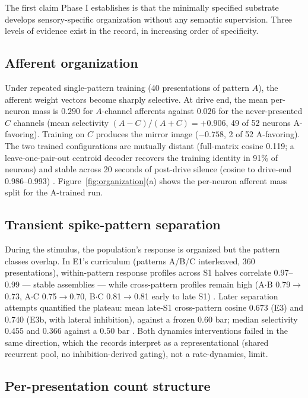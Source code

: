 The first claim Phase I establishes is that the minimally specified
substrate develops sensory-specific organization without any semantic
supervision. Three levels of evidence exist in the record, in increasing
order of specificity.

\subsection{Afferent organization}

Under repeated single-pattern training (40 presentations of pattern
\(A\)), the afferent weight vectors become sharply selective. At drive
end, the mean per-neuron mass is \(0.290\) for \(A\)-channel afferents
against \(0.026\) for the never-presented \(C\) channels (mean
selectivity \((A-C)/(A+C) = +0.906\), 49 of 52 neurons A-favoring).
Training on \(C\) produces the mirror image (\(-0.758\), 2 of 52
A-favoring). The two trained configurations are mutually distant
(full-matrix cosine 0.119; a leave-one-pair-out centroid decoder
recovers the training identity in 91\% of neurons) and stable across 20
seconds of post-drive silence (cosine to drive-end 0.986--0.993)
\cite{synmem}. Figure~\ref{fig:organization}(a) shows the per-neuron
afferent mass split for the A-trained run.

\subsection{Transient spike-pattern separation}

During the stimulus, the population's response is organized but the
pattern classes overlap. In E1's curriculum (patterns A/B/C interleaved,
360 presentations), within-pattern response profiles across S1 halves
correlate 0.97--0.99 --- stable assemblies --- while cross-pattern
profiles remain high (A\(\cdot\)B 0.79\(\rightarrow\)0.73,
A\(\cdot\)C 0.75\(\rightarrow\)0.70, B\(\cdot\)C 0.81\(\rightarrow\)0.81
early to late S1) \cite{e1proto}. Later separation attempts quantified
the plateau: mean late-S1 cross-pattern cosine 0.673 (E3) and 0.740
(E3b, with lateral inhibition), against a frozen 0.60 bar; median
selectivity 0.455 and 0.366 against a 0.50 bar
\cite{e3bproto}. Both dynamics interventions failed in the same
direction, which the records interpret as a representational (shared
recurrent pool, no inhibition-derived gating), not a rate-dynamics,
limit.

\subsection{Per-presentation count structure}

